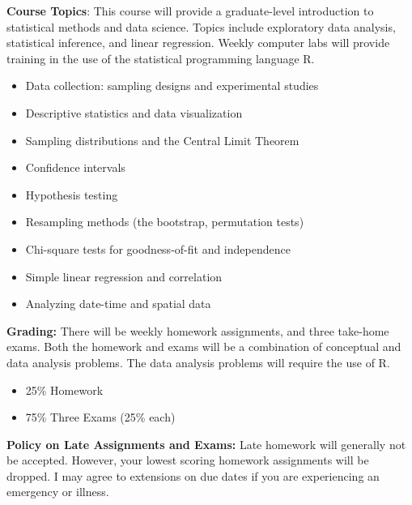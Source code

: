 \documentclass[12pt]{report}
\newenvironment{myitemize}
{ \begin{itemize}
    \setlength{\itemsep}{5pt}
    \setlength{\parskip}{0pt}
    \setlength{\parsep}{0pt}     }
{ \end{itemize}                  }
\begin{document}
\textbf{Course Topics}: This course will provide a graduate-level introduction to statistical methods and data science.  Topics include exploratory data analysis, statistical inference, and linear regression. Weekly computer labs will provide training in the use of the statistical programming language R.     
\begin{myitemize}
\item Data collection: sampling designs and experimental studies
\item Descriptive statistics and data visualization
\item Sampling distributions and the Central Limit Theorem
\item Confidence intervals 
\item Hypothesis testing
\item Resampling methods (the bootstrap, permutation tests)
\item Chi-square tests for goodness-of-fit and independence
\item Simple linear regression and correlation
\item Analyzing date-time and spatial data\\
\end{myitemize} 

\textbf{Grading:}
There will be weekly homework assignments, and three take-home exams.  Both the homework and exams will be a combination of conceptual and data analysis problems.  The data analysis problems will require the use of R.  
\begin{myitemize}
\item 25\% Homework
\item 75\% Three Exams (25\% each)\\ 
\end{myitemize} 
  
\textbf{Policy on Late Assignments and Exams:}  Late homework will generally not be accepted.  However, your lowest scoring homework assignments will be dropped.  I may agree to extensions on due dates if you are experiencing an emergency or illness.\\
\end{document}
